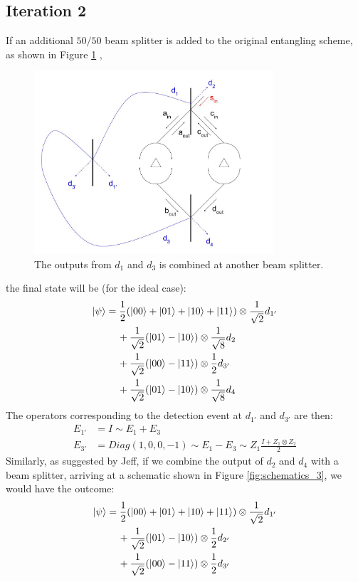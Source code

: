 \documentclass[letterpaper,10pt]{article}
\begin{document}
\subsection{Iteration 2}
\label{subsec:iteration2}
If an additional $50/50$ beam splitter is added to the original entangling scheme, as shown in Figure \ref{fig:schematics_2} \cite{rrdoc},
\begin{figure}[h]
\centering
         \includegraphics[width=3.5in]{DIT_entanglement_2.jpg}
         \caption{The outputs from $d_1$ and $d_3$ is combined at another beam splitter.}
         \label{fig:schematics_2}
\end{figure}
the final state will be (for the ideal case):
\begin{equation}
\begin{aligned}
	\Ket{\psi}&=\frac{1}{2}(\Ket{00}+\Ket{01}+\Ket{10}+\Ket{11})\otimes \frac{1}{\sqrt{2}}d_{1'}\\
	&\quad\, +\frac{1}{\sqrt{2}}(\Ket{01}-\Ket{10})\otimes\frac{1}{\sqrt{8}}d_2\\
	&\quad\, +\frac{1}{\sqrt{2}}(\Ket{00}-\Ket{11})\otimes\frac{1}{2}d_{3'}\\
	&\quad\, +\frac{1}{\sqrt{2}}(\Ket{01}-\Ket{10})\otimes\frac{1}{\sqrt{8}}d_4
\end{aligned}
\end{equation}
The operators corresponding to the detection event at $d_{1'}$ and $d_{3'}$ are then:
\begin{align}
	\label{eq:E1'}
	E_{1'} &= I \sim E_1+E_3\\
	\label{eq:E3'}	
	E_{3'} &= Diag(1,0,0,-1) \sim E_1-E_3 \sim Z_1\frac{I+Z_1\otimes Z_2}{2}
\end{align}
Similarly, as suggested by Jeff, if we combine the output of $d_2$ and $d_4$ with a beam splitter, arriving at a schematic shown in Figure \ref{fig:schematics_3}, we would have the outcome:
\begin{equation}
\begin{aligned}
	\Ket{\psi}&=\frac{1}{2}(\Ket{00}+\Ket{01}+\Ket{10}+\Ket{11})\otimes \frac{1}{\sqrt{2}}d_{1'}\\
	&\quad\, +\frac{1}{\sqrt{2}}(\Ket{01}-\Ket{10})\otimes\frac{1}{2}d_{2'}\\
	&\quad\, +\frac{1}{\sqrt{2}}(\Ket{00}-\Ket{11})\otimes\frac{1}{2}d_{3'}
\end{aligned}
\end{equation}
\end{document}
